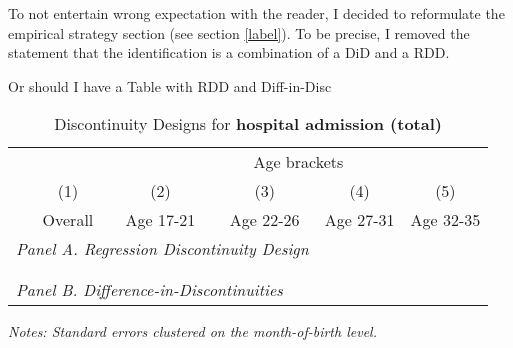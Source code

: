 To not entertain wrong expectation with the reader, I decided to reformulate the empirical strategy section (see section \ref{label}). To be precise, I removed 
the statement that the identification is a combination of a DiD and a RDD. 





Or should I have a Table with RDD and Diff-in-Disc
\begin{table}[H] \centering 
	\begin{threeparttable} \centering \caption{Discontinuity Designs for \textbf{hospital admission (total)}}\label{tab_mlch: revision_RDD_DiffDisc_hopsital2_total}
		{\def\sym#1{\ifmmode^{#1}\else\(^{#1}\)\fi} 
			\begin{tabular}{l*{5}{c}}
				\toprule 
				& & \multicolumn{4}{c}{Age brackets} \\ 
				\cmidrule(lr){3-6}
				&\multicolumn{1}{c}{(1)}&\multicolumn{1}{c}{(2)}&\multicolumn{1}{c}{(3)}&\multicolumn{1}{c}{(4)}&\multicolumn{1}{c}{(5)}\\
				&\multicolumn{1}{c}{Overall}&\multicolumn{1}{c}{Age 17-21}&\multicolumn{1}{c}{Age 22-26}&\multicolumn{1}{c}{Age 27-31} &\multicolumn{1}{c}{Age 32-35}\\
				\midrule
				\multicolumn{4}{l}{\emph{Panel A. Regression Discontinuity Design}} \\
				 \\ \\
				
				\multicolumn{4}{l}{\emph{Panel B. Difference-in-Discontinuities}} \\
				 
				\bottomrule 
		\end{tabular}}
		\begin{tablenotes} 
			\item \scriptsize \emph{Notes: Standard errors clustered on the month-of-birth level.} 
		\end{tablenotes} 
	\end{threeparttable} 
\end{table}







